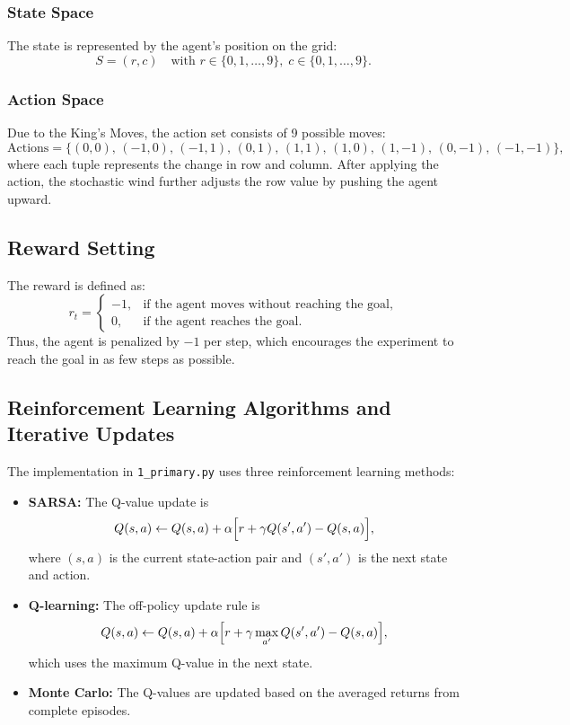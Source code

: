 \documentclass{article}
\begin{document}
\subsubsection{State Space}
The state is represented by the agent’s position on the grid:
\[
S = (r, c) \quad \text{with } r \in \{0,1,\dots,9\}, \; c \in \{0,1,\dots,9\}.
\]

\subsubsection{Action Space}
Due to the King’s Moves, the action set consists of 9 possible moves:
\[
\text{Actions} = \{(0,0),\, (-1,0),\, (-1,1),\, (0,1),\, (1,1),\, (1,0),\, (1,-1),\, (0,-1),\, (-1,-1)\},
\]
where each tuple represents the change in row and column. After applying the action, the stochastic wind further adjusts the row value by pushing the agent upward.

\subsection{Reward Setting}
The reward is defined as:
\[
r_t =
\begin{cases}
-1, & \text{if the agent moves without reaching the goal},\\[1mm]
0, & \text{if the agent reaches the goal.}
\end{cases}
\]
Thus, the agent is penalized by $-1$ per step, which encourages the experiment to reach the goal in as few steps as possible.

\subsection{Reinforcement Learning Algorithms and Iterative Updates}
The implementation in \texttt{1\_primary.py} uses three reinforcement learning methods:
\begin{itemize}
    \item \textbf{SARSA:} The Q-value update is
    \[
    Q(s,a) \leftarrow Q(s,a) + \alpha \Bigl[r + \gamma Q(s',a') - Q(s,a)\Bigr],
    \]
    where $(s,a)$ is the current state-action pair and $(s',a')$ is the next state and action.
    \item \textbf{Q-learning:} The off-policy update rule is
    \[
    Q(s,a) \leftarrow Q(s,a) + \alpha \Bigl[r + \gamma \max_{a'} Q(s',a') - Q(s,a)\Bigr],
    \]
    which uses the maximum Q-value in the next state.
    \item \textbf{Monte Carlo:} The Q-values are updated based on the averaged returns from complete episodes.
\end{itemize}
\end{document}
